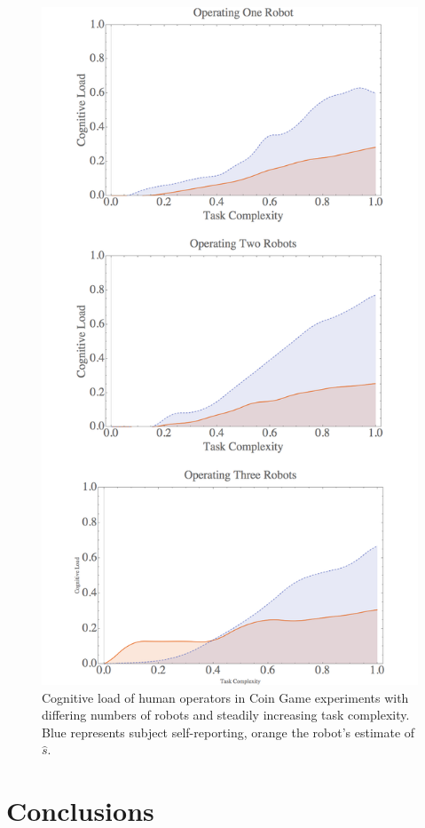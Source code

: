 \documentclass{sig-alternate}
\begin{document}

\begin{figure}  
\centering
\includegraphics[width=.4\textwidth]{final-results.png}
\caption{Cognitive load of human operators in Coin Game experiments with differing numbers of robots and steadily increasing task complexity.  Blue represents subject self-reporting, orange the robot's estimate of $\hat{s}$.}
\label{fig:final-results}
\end{figure}

\section{Conclusions}
\end{document}
